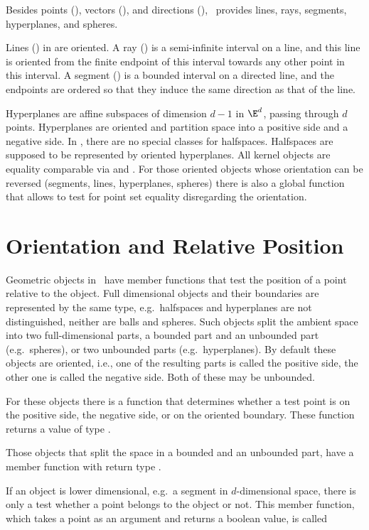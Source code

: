 Besides points (), vectors (), and
directions (), \cgal\ provides lines, rays,
segments, hyperplanes, and spheres.

Lines () in {\cgal} are oriented.  A ray
() is a semi-infinite interval on a line, and this line
is oriented from the finite endpoint of this interval towards any
other point in this interval. A segment () is a
bounded interval on a directed line, and the endpoints are ordered so
that they induce the same direction as that of the line.

Hyperplanes are affine subspaces of dimension $d-1$ in $\E^d$, passing
through $d$ points.  Hyperplanes are oriented and partition space into
a positive side and a negative side.  In \cgal, there are no special
classes for halfspaces.  Halfspaces are supposed to be represented by
oriented hyperplanes. All kernel objects are equality comparable via
 and . For those oriented objects
whose orientation can be reversed (segments, lines, hyperplanes,
spheres) there is also a global function  that
allows to test for point set equality disregarding the orientation.


\section{Orientation and Relative Position}

Geometric objects in \cgal\ have member functions that test the
position of a point relative to the object.  Full dimensional objects
and their boundaries are represented by the same type, e.g.\ 
halfspaces and hyperplanes are not distinguished, neither are balls
and spheres. Such objects split the ambient space into two
full-dimensional parts, a bounded part and an unbounded part (e.g.\ 
spheres), or two unbounded parts (e.g.\ hyperplanes). By default these
objects are oriented, i.e., one of the resulting parts is called the
positive side, the other one is called the negative side. Both of
these may be unbounded.

For these objects there is a function  that
determines whether a test point is on the positive side, the negative
side, or on the oriented boundary. These function returns a value of
type \ccc{Oriented_side}.

Those objects that split the space in a bounded and an unbounded part,
have a member function  with return type
\ccc{Bounded_side}.

If an object is lower dimensional, e.g.\ a segment in $d$-dimensional
space, there is only a test whether a point belongs to the object or
not. This member function, which takes a point as an argument and
returns a boolean value, is called \ccStyle{has_on()}

